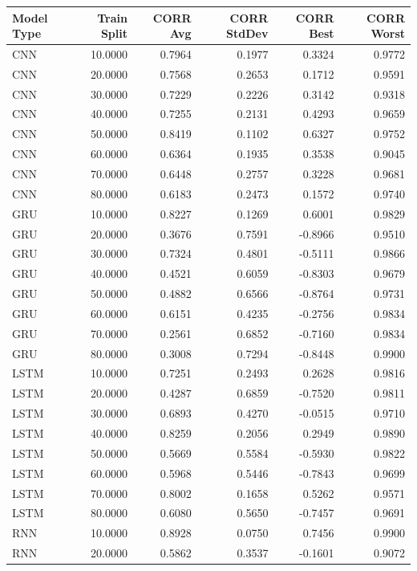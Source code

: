 \begin{tabular}{lrrrrr}
\toprule
Model Type & Train Split & CORR Avg & CORR StdDev & CORR Best & CORR Worst \\
\midrule
CNN & 10.0000 & 0.7964 & 0.1977 & 0.3324 & 0.9772 \\
CNN & 20.0000 & 0.7568 & 0.2653 & 0.1712 & 0.9591 \\
CNN & 30.0000 & 0.7229 & 0.2226 & 0.3142 & 0.9318 \\
CNN & 40.0000 & 0.7255 & 0.2131 & 0.4293 & 0.9659 \\
CNN & 50.0000 & 0.8419 & 0.1102 & 0.6327 & 0.9752 \\
CNN & 60.0000 & 0.6364 & 0.1935 & 0.3538 & 0.9045 \\
CNN & 70.0000 & 0.6448 & 0.2757 & 0.3228 & 0.9681 \\
CNN & 80.0000 & 0.6183 & 0.2473 & 0.1572 & 0.9740 \\
GRU & 10.0000 & 0.8227 & 0.1269 & 0.6001 & 0.9829 \\
GRU & 20.0000 & 0.3676 & 0.7591 & -0.8966 & 0.9510 \\
GRU & 30.0000 & 0.7324 & 0.4801 & -0.5111 & 0.9866 \\
GRU & 40.0000 & 0.4521 & 0.6059 & -0.8303 & 0.9679 \\
GRU & 50.0000 & 0.4882 & 0.6566 & -0.8764 & 0.9731 \\
GRU & 60.0000 & 0.6151 & 0.4235 & -0.2756 & 0.9834 \\
GRU & 70.0000 & 0.2561 & 0.6852 & -0.7160 & 0.9834 \\
GRU & 80.0000 & 0.3008 & 0.7294 & -0.8448 & 0.9900 \\
LSTM & 10.0000 & 0.7251 & 0.2493 & 0.2628 & 0.9816 \\
LSTM & 20.0000 & 0.4287 & 0.6859 & -0.7520 & 0.9811 \\
LSTM & 30.0000 & 0.6893 & 0.4270 & -0.0515 & 0.9710 \\
LSTM & 40.0000 & 0.8259 & 0.2056 & 0.2949 & 0.9890 \\
LSTM & 50.0000 & 0.5669 & 0.5584 & -0.5930 & 0.9822 \\
LSTM & 60.0000 & 0.5968 & 0.5446 & -0.7843 & 0.9699 \\
LSTM & 70.0000 & 0.8002 & 0.1658 & 0.5262 & 0.9571 \\
LSTM & 80.0000 & 0.6080 & 0.5650 & -0.7457 & 0.9691 \\
RNN & 10.0000 & 0.8928 & 0.0750 & 0.7456 & 0.9900 \\
RNN & 20.0000 & 0.5862 & 0.3537 & -0.1601 & 0.9072 \\

\end{tabular}
